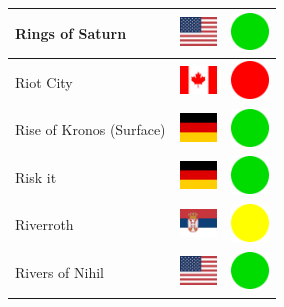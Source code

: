 \documentclass[12pt, a4paper, twoside]{report}
\begin{document}
\begin{center}
\begin{longtable}{|p{5cm}|p{2cm}|p{2cm}|}
 Rings of Saturn                                            & \includegraphics[width=1cm]{4x3/us} &   \includegraphics[width=1cm]{likes/y} \\ \hline
 Riot City                                                  & \includegraphics[width=1cm]{4x3/ca} &   \includegraphics[width=1cm]{likes/n} \\ \hline
 Rise of Kronos (Surface)                                   & \includegraphics[width=1cm]{4x3/de} &   \includegraphics[width=1cm]{likes/y} \\ \hline
 Risk it                                                    & \includegraphics[width=1cm]{4x3/de} &   \includegraphics[width=1cm]{likes/y} \\ \hline
 Riverroth                                                  & \includegraphics[width=1cm]{4x3/rs} &   \includegraphics[width=1cm]{likes/m} \\ \hline
 Rivers of Nihil                                            & \includegraphics[width=1cm]{4x3/us} &   \includegraphics[width=1cm]{likes/y} \\ \hline

\end{longtable}
\end{center}
\end{document}
